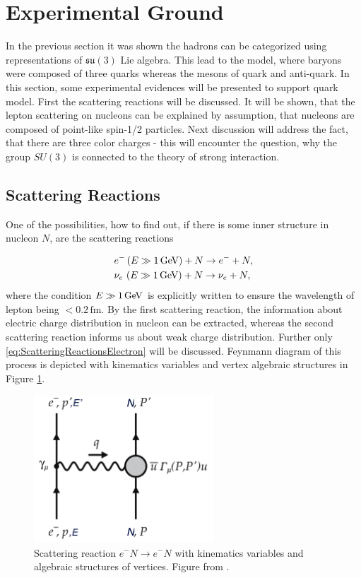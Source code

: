 \section{Experimental Ground}

In the previous section it was shown the hadrons can be categorized using
representations of $\mathfrak{su}(3)$ Lie algebra. This lead to the model, where
baryons were composed of three quarks whereas the mesons of quark and
anti-quark. In this section, some experimental evidences will be presented to
support quark model. First the scattering reactions will be discussed. It will
be shown, that the lepton scattering on nucleons can be explained by assumption,
that nucleons are composed of point-like spin-1/2 particles. Next discussion
will address the fact, that there are three color charges - this will encounter
the question, why the group $SU(3)$ is connected to the theory of strong
interaction.

\subsection{Scattering Reactions}

One of the possibilities, how to find out, if there is some inner structure in
nucleon $N$, are the scattering reactions

\begin{align}
  &e^- \, (E \gg 1\,\text{GeV}) + N \rightarrow e^- + N,
  \label{eq:ScatteringReactionsElectron} \\
  &\nu_e \,\, (E \gg 1\,\text{GeV}) + N \rightarrow \nu_e + N,
  \label{eq:ScatteringReactionsNeutrino}
\end{align}
where the condition $E \gg 1 \,\text{GeV}$ is explicitly written to ensure the wavelength
of lepton being $< 0.2\,\text{fm}$. By the first scattering reaction, the information
about electric charge distribution in nucleon can be extracted, whereas the
second scattering reaction informs us about weak charge distribution. Further only
\eqref{eq:ScatteringReactionsElectron} will be discussed. Feynmann diagram of this
process is depicted with kinematics variables and vertex algebraic structures 
in Figure \ref{fig:Scattering}. 

\begin{figure}
  \centering
  \includegraphics[width=0.6\textwidth]{Chapter1/Scattering.png} 
  \caption{Scattering reaction $e^-N \rightarrow e^-N$ with kinematics variables
    and algebraic structures of vertices. Figure from \cite{QCDTextbook}.}
  \label{fig:Scattering}
\end{figure}

